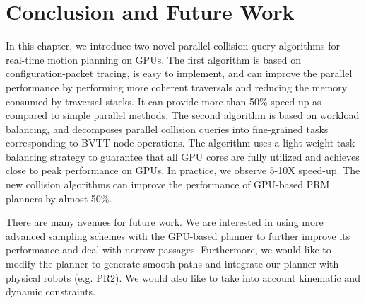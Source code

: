 \section{Conclusion and Future Work}
In this chapter, we introduce two novel parallel collision query algorithms for real-time motion planning on GPUs.
The first algorithm is based on configuration-packet tracing, is easy to implement, and can improve the parallel
performance by performing more coherent traversals and reducing the memory consumed by traversal stacks. It can provide
more than 50\% speed-up as compared to simple parallel methods. The second algorithm is based on workload balancing, and
decomposes parallel collision queries into fine-grained tasks corresponding to  BVTT node operations. The algorithm
uses a light-weight task-balancing strategy to guarantee that all GPU cores are fully utilized and achieves
close to peak performance on GPUs. In practice, we observe 5-10X speed-up. The new collision algorithms can improve
the performance of GPU-based PRM planners by almost 50\%.

There are many avenues for future work. We are interested in using more advanced sampling schemes with the
GPU-based planner to further improve its performance and deal with narrow passages. Furthermore, we would like to
modify the planner to generate smooth paths and integrate our planner with physical robots (e.g. PR2).
We would also like to take into account kinematic and dynamic constraints.
